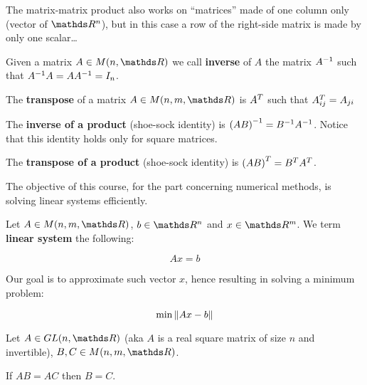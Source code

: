 \documentclass[computationalMathematics.tex]{subfiles}
\begin{document}
{The matrix-matrix product also works on ``matrices'' made of one column only (vector of $\R^n$), but in this case a row of the right-side matrix is made by only one scalar\ldots

Given a matrix $A \in M(n, \R)$ we call \textbf{inverse} of $A$ the matrix ${A}^{-1}$ such that ${A}^{-1} A = A {A}^{-1} = I_{n}$.

The \textbf{transpose} of a matrix $A \in M(n, m, \R)$ is ${A}^{T}$ such that ${A}^{T}_{ij} = A_{ji}$

The \textbf{inverse of a product} (shoe-sock identity) is ${(A B)}^{-1} = {B}^{-1} {A}^{-1}$.
Notice that this identity holds only for square matrices.

The \textbf{transpose of a product} (shoe-sock identity) is ${(A B)}^{T} = {B}^{T} {A}^{T}$.
}

The objective of this course, for the part concerning numerical methods, is solving linear systems efficiently.

\begin{definition}
  Let $A \in M(n, m, \R)$, $b \in \R^n$ and $x \in \R^m$. We term \textbf{linear system} the following:

  \[
Ax = b
  \]
\end{definition}

Our goal is to approximate such vector $x$, hence resulting in solving a minimum problem:

\[
  \min\limits \left\lVert Ax - b\right\rVert
\]


\begin{proposition}
  Let $A \in GL(n, \R)$ (aka $A$ is a real square matrix of size $n$ and invertible), $B, C \in M(n, m, \R)$.

  If $AB = AC$ then $B=C$.
\end{proposition}
\end{document}
